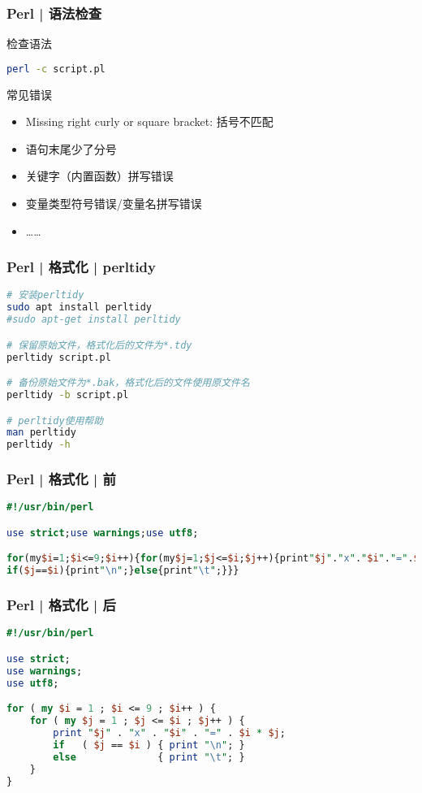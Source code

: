 \begin{frame}[fragile]
  \frametitle{Perl | 语法检查}
  \begin{block}{\alert{检查语法}}
\begin{lstlisting}[language=bash]
perl -c script.pl
\end{lstlisting}
  \end{block}
  \pause
  \begin{block}{常见错误}
    \begin{itemize}
      \item Missing right curly or square bracket: 括号不匹配
      \item 语句末尾少了分号
      \item 关键字（内置函数）拼写错误
      \item 变量类型符号错误/变量名拼写错误
      \item ……
    \end{itemize}
  \end{block}
\end{frame}

\begin{frame}[fragile]
  \frametitle{Perl | 格式化 | \alert{perltidy}}
\begin{lstlisting}[language=bash]
# 安装perltidy
sudo apt install perltidy
#sudo apt-get install perltidy

# 保留原始文件，格式化后的文件为*.tdy
perltidy script.pl

# 备份原始文件为*.bak，格式化后的文件使用原文件名
perltidy -b script.pl

# perltidy使用帮助
man perltidy
perltidy -h
\end{lstlisting} 
\end{frame}

\begin{frame}[fragile]
  \frametitle{Perl | 格式化 | 前}
\begin{lstlisting}[language=Perl]
#!/usr/bin/perl 

use strict;use warnings;use utf8;

for(my$i=1;$i<=9;$i++){for(my$j=1;$j<=$i;$j++){print"$j"."x"."$i"."=".$i*$j;
if($j==$i){print"\n";}else{print"\t";}}}
\end{lstlisting} 
\end{frame}

\begin{frame}[fragile]
  \frametitle{Perl | 格式化 | \alert{后}}
\begin{lstlisting}[language=Perl,basicstyle=\small\tt]
#!/usr/bin/perl 

use strict;
use warnings;
use utf8;

for ( my $i = 1 ; $i <= 9 ; $i++ ) {
    for ( my $j = 1 ; $j <= $i ; $j++ ) {
        print "$j" . "x" . "$i" . "=" . $i * $j;
        if   ( $j == $i ) { print "\n"; }
        else              { print "\t"; }
    }
}
\end{lstlisting} 
\end{frame}

